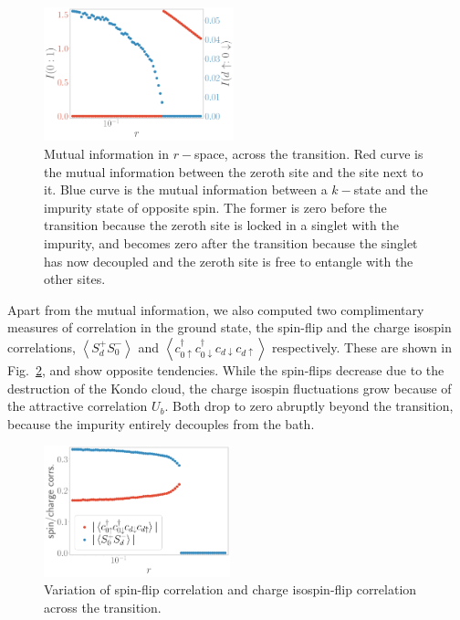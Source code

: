 \documentclass[reprint,superscriptaddress,floatfix]{revtex4-2}
\begin{document}
\begin{figure}[!htb]
\includegraphics[width=0.49\textwidth]{I_r.pdf}
\caption{Mutual information in \(r-\)space, across the transition. Red curve is the mutual information between the zeroth site and the site next to it. Blue curve is the mutual information between a \(k-\)state and the impurity state of opposite spin. The former is zero before the transition because the zeroth site is locked in a singlet with the impurity, and becomes zero after  the transition because the singlet has now decoupled and the zeroth site is free to entangle with the other sites.}
\label{mut_inf_r}
\end{figure}

{\color{blue}Apart from the mutual information, we also computed two complimentary measures of correlation in the ground state, the spin-flip and the charge isospin correlations, \(\left<S_d^+ S_0^- \right>\) and \(\left<c^\dagger_{ 0 \uparrow} c^\dagger_{0 \downarrow} c_{d \downarrow} c_{d \uparrow} \right>\) respectively. These are shown in Fig.~\ref{charge-spin}, and show opposite tendencies. While the spin-flips decrease due to the destruction of the Kondo cloud, the charge isospin fluctuations grow because of the attractive correlation \(U_b\). Both drop to zero abruptly beyond the transition, because the impurity entirely decouples from the bath.}

\begin{figure}[!htb]
	\centering
	\includegraphics[width=0.48\textwidth]{odlro_d0.pdf}
	\caption{Variation of spin-flip correlation and charge isospin-flip correlation across the transition.}
	\label{charge-spin}
\end{figure}
\end{document}
